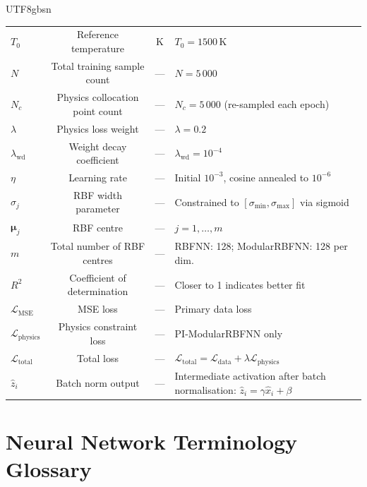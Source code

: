 \documentclass[a4paper,12pt]{report}
\newcommand{\Ldata}{\mathcal{L}_{\text{data}}}
\newcommand{\Lphys}{\mathcal{L}_{\text{physics}}}
\newcommand{\Ltotal}{\mathcal{L}_{\text{total}}}
\newcommand{\Lmse}{\mathcal{L}_{\text{MSE}}}
\begin{document}
\begin{CJK}{UTF8}{gbsn}
\begin{longtable}{lcc p{7.5cm}}
  $T_0$ & Reference temperature & K & $T_0 = 1500$\,K \\
  $N$ & Total training sample count & --- & $N = 5\,000$ \\
  $N_c$ & Physics collocation point count & --- & $N_c = 5\,000$ (re-sampled each epoch) \\
  $\lambda$ & Physics loss weight & --- & $\lambda = 0.2$ \\
  $\lambda_{\text{wd}}$ & Weight decay coefficient & --- & $\lambda_{\text{wd}} = 10^{-4}$ \\
  $\eta$ & Learning rate & --- & Initial $10^{-3}$, cosine annealed to $10^{-6}$ \\
  $\sigma_j$ & RBF width parameter & --- & Constrained to $[\sigma_{\min},\sigma_{\max}]$ via sigmoid \\
  $\boldsymbol{\mu}_j$ & RBF centre & --- & $j = 1,\ldots,m$ \\
  $m$ & Total number of RBF centres & --- & RBFNN: 128; ModularRBFNN: 128 per dim. \\
  $R^2$ & Coefficient of determination & --- & Closer to 1 indicates better fit \\
  $\Lmse$ & MSE loss & --- & Primary data loss \\
  $\Lphys$ & Physics constraint loss & --- & PI-ModularRBFNN only \\
  $\Ltotal$ & Total loss & --- & $\Ltotal = \Ldata + \lambda\Lphys$ \\
  $\hat{z}_i$ & Batch norm output & --- & Intermediate activation after batch normalisation: $\hat{z}_i = \gamma\hat{x}_i + \beta$ \\
\end{longtable}

\chapter{Neural Network Terminology Glossary}
\label{app:terms}


\end{CJK}
\end{document}
